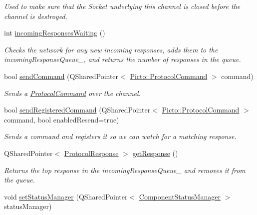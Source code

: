 \begin{DoxyCompactItemize}
\begin{DoxyCompactList}\small\item\em Used to make sure that the Socket underlying this channel is closed before the channel is destroyed. \end{DoxyCompactList}\item 
int \hyperlink{class_picto_1_1_command_channel_a2178a704ecbacc3cc4b68af6949326d9}{incoming\-Responses\-Waiting} ()
\begin{DoxyCompactList}\small\item\em Checks the network for any new incoming responses, adds them to the incoming\-Response\-Queue\-\_\-, and returns the number of responses in the queue. \end{DoxyCompactList}\item 
bool \hyperlink{class_picto_1_1_command_channel_a5b6805cc3415f144d03ae7e343df3d32}{send\-Command} (Q\-Shared\-Pointer$<$ \hyperlink{struct_picto_1_1_protocol_command}{Picto\-::\-Protocol\-Command} $>$ command)
\begin{DoxyCompactList}\small\item\em Sends a \hyperlink{struct_picto_1_1_protocol_command}{Protocol\-Command} over the channel. \end{DoxyCompactList}\item 
bool \hyperlink{class_picto_1_1_command_channel_a1d6415c16c0bea0578876d13fe270074}{send\-Registered\-Command} (Q\-Shared\-Pointer$<$ \hyperlink{struct_picto_1_1_protocol_command}{Picto\-::\-Protocol\-Command} $>$ command, bool enabled\-Resend=true)
\begin{DoxyCompactList}\small\item\em Sends a command and registers it so we can watch for a matching response. \end{DoxyCompactList}\item 
Q\-Shared\-Pointer$<$ \hyperlink{struct_picto_1_1_protocol_response}{Protocol\-Response} $>$ \hyperlink{class_picto_1_1_command_channel_af1735870ee016525f58b6c585fdad301}{get\-Response} ()
\begin{DoxyCompactList}\small\item\em Returns the top response in the incoming\-Response\-Queue\-\_\- and removes it from the queue. \end{DoxyCompactList}\item 
void \hyperlink{class_picto_1_1_command_channel_a1a0749ef93c32a3f070dadd4e793355f}{set\-Status\-Manager} (Q\-Shared\-Pointer$<$ \hyperlink{class_component_status_manager}{Component\-Status\-Manager} $>$ status\-Manager)

\end{DoxyCompactItemize}
